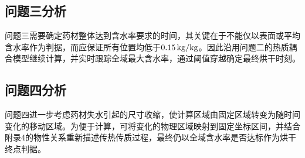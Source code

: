 \subsection{问题三分析}
问题三需要确定药材整体达到含水率要求的时间，其关键在于不能仅以表面或平均含水率作为判据，而应保证所有位置均低于$0.15\,\mathrm{kg/kg}$。因此沿用问题二的热质耦合模型继续计算，并实时跟踪全域最大含水率，通过阈值穿越确定最终烘干时刻。

\subsection{问题四分析}
问题四进一步考虑药材失水引起的尺寸收缩，使计算区域由固定区域转变为随时间变化的移动区域。为便于计算，可将变化的物理区域映射到固定坐标区间，并结合附录4的物性关系重新描述传热传质过程，最终仍以全域含水率是否达标作为烘干终点判据。

